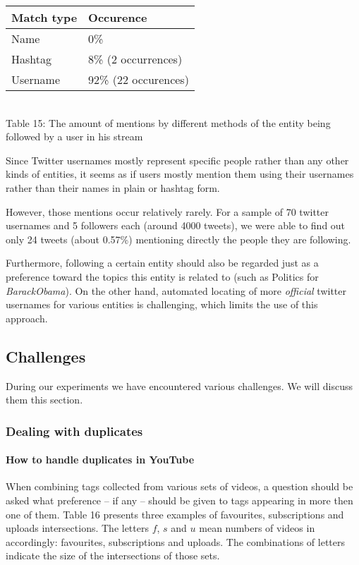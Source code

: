 \begin{center}
  \begin{tabular}{ | p{3cm}| p{2cm} | } \hline
    Match type & Occurence \\ \hline
    Name & 0\% \\ \hline
    Hashtag & 8\% (2 occurrences) \\ \hline
    Username & 92\% (22 occurences) \\ \hline
  \end{tabular} \\
  Table 15: The amount of mentions by different methods of the entity being followed by a user in his stream \\
\end{center}

Since Twitter usernames mostly represent specific people rather than any other kinds of entities, it seems as if users mostly
mention them using their usernames rather than their names in plain or hashtag form.

However, those mentions occur relatively rarely. For a sample of 70 twitter usernames and 5 followers each
(around 4000 tweets), we were able to find out only 24 tweets (about 0.57\%) mentioning directly the people they are following.

Furthermore, following a certain entity should also be regarded just as a preference toward the topics this entity is related to (such as Politics for \textit{BarackObama}). On the other hand, automated locating of more \textit{official} twitter usernames for various entities is challenging, which
limits the use of this approach.

\subsection{Challenges}

During our experiments we have encountered various challenges. We will discuss them this section.

\subsubsection{Dealing with duplicates}

\paragraph{How to handle duplicates in YouTube}

When combining tags collected from various sets of videos, a question should be
asked what preference -- if any -- should be given to tags appearing in more
then one of them. Table 16 presents three examples of favourites,
subscriptions and uploads intersections. The letters $f$, $s$ and $u$ mean
numbers of videos in accordingly: favourites, subscriptions and uploads. The
combinations of letters indicate the size of the intersections of those sets. \\

